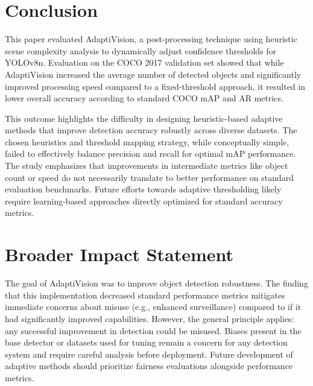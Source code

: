 \documentclass{article}
\begin{document}
\section{Conclusion} \label{sec:conclusion}
This paper evaluated AdaptiVision, a post-processing technique using heuristic scene complexity analysis to dynamically adjust confidence thresholds for YOLOv8n. Evaluation on the COCO 2017 validation set showed that while AdaptiVision increased the average number of detected objects and significantly improved processing speed compared to a fixed-threshold approach, it resulted in lower overall accuracy according to standard COCO mAP and AR metrics.

This outcome highlights the difficulty in designing heuristic-based adaptive methods that improve detection accuracy robustly across diverse datasets. The chosen heuristics and threshold mapping strategy, while conceptually simple, failed to effectively balance precision and recall for optimal mAP performance. The study emphasizes that improvements in intermediate metrics like object count or speed do not necessarily translate to better performance on standard evaluation benchmarks. Future efforts towards adaptive thresholding likely require learning-based approaches directly optimized for standard accuracy metrics.

\section*{Broader Impact Statement}

The goal of AdaptiVision was to improve object detection robustness. The finding that this implementation decreased standard performance metrics mitigates immediate concerns about misuse (e.g., enhanced surveillance) compared to if it had significantly improved capabilities. However, the general principle applies: any successful improvement in detection could be misused. Biases present in the base detector or datasets used for tuning remain a concern for any detection system and require careful analysis before deployment. Future development of adaptive methods should prioritize fairness evaluations alongside performance metrics.
\end{document}
